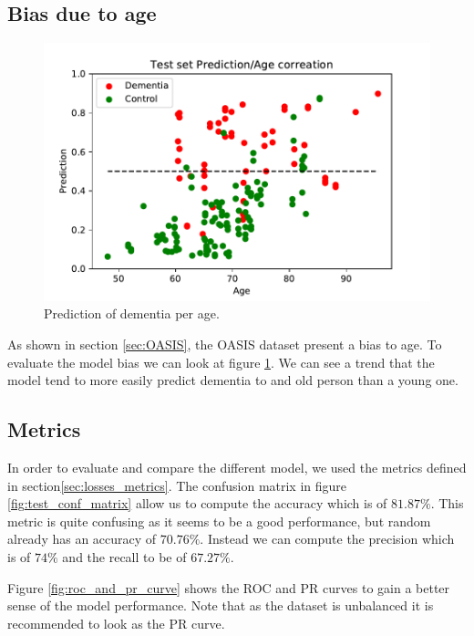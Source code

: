 \subsection{Bias due to age}
\begin{figure}
 \centering
 \includegraphics[width=.9\linewidth]{figures/Experiements/Eval/prediction_age.pdf}
 \captionsetup{width=.9\linewidth}
 \caption[PredPerAge]{Prediction of dementia per age.}
 \label{fig:prediction_per_age}
\end{figure}
As shown in section \ref{sec:OASIS}, the OASIS dataset present a bias to age. To evaluate the model bias we can look at figure \ref{fig:prediction_per_age}. We can see a trend that the model tend to more easily predict dementia to and old person than a young one.


\subsection{Metrics}
In order to evaluate and compare the different model, we used the metrics defined in section\ref{sec:losses_metrics}. The confusion matrix in figure \ref{fig:test_conf_matrix} allow us to compute the accuracy which is of $81.87\%$. This metric is quite confusing as it seems to be a good performance, but random already has an accuracy of $70.76\%$. Instead we can compute the precision which is of $74\%$ and the recall to be of $67.27\%$.

Figure \ref{fig:roc_and_pr_curve} shows the ROC and PR curves to gain a better sense of the model performance. Note that as the dataset is unbalanced it is recommended to look as the PR curve. 


